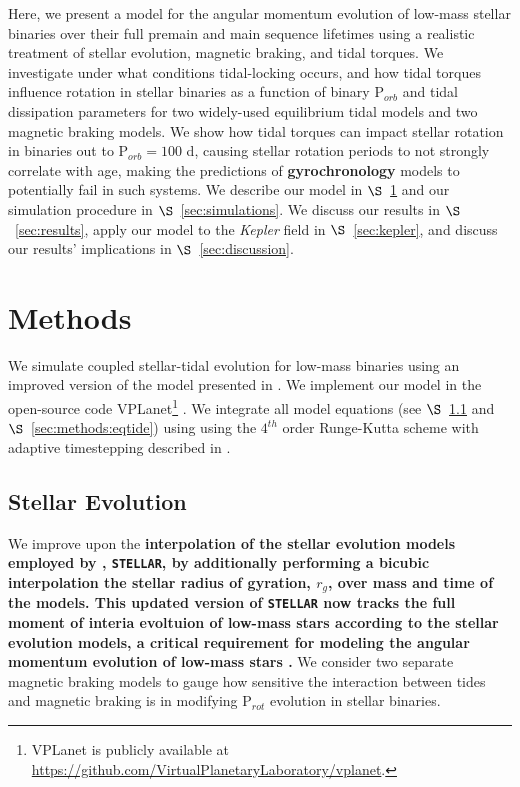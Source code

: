 \documentclass[twocolumn]{aastex61}
\newcommand{\xxx}[1]{{\textbf{#1}}}
\newcommand{\stellar}[0]{\texttt{STELLAR}\xspace}
\newcommand{\kepler}[0]{\textit{Kepler}\xspace}
\begin{document}
Here, we present a model for the angular momentum evolution of low-mass stellar binaries over their full premain and main sequence lifetimes using a realistic treatment of stellar evolution, magnetic braking, and tidal torques. We investigate under what conditions tidal-locking occurs, and how tidal torques influence rotation in stellar binaries as a function of binary P$_{orb}$ and tidal dissipation parameters for two widely-used equilibrium tidal models and two magnetic braking models.  We show how tidal torques can impact stellar rotation in binaries out to P$_{orb} = 100$ d, causing stellar rotation periods to not strongly correlate with age, making the predictions of \xxx{gyrochronology} models to potentially fail in such systems.  We describe our model in $\S$~\ref{sec:methods} and our simulation procedure in $\S$~\ref{sec:simulations}.  We discuss our results in $\S$~\ref{sec:results}, apply our model to the \kepler field in $\S$~\ref{sec:kepler}, and discuss our results' implications in $\S$~\ref{sec:discussion}.


\section{Methods} \label{sec:methods}

We simulate coupled stellar-tidal evolution for low-mass binaries using an improved version of the model presented in \citet{Fleming2018}.  We implement our model in the open-source code VPLanet\footnote{VPLanet is publicly available
at \href{https://github.com/VirtualPlanetaryLaboratory/vplanet}{{https://github.com/VirtualPlanetaryLaboratory/vplanet}}.} \citep[][Barnes et al., in prep]{Barnes2016,vplanet2018}.  We integrate all model equations (see $\S$~\ref{sec:methods:stellar} and $\S$~\ref{sec:methods:eqtide}) using using the $4^{th}$ order Runge-Kutta scheme with adaptive timestepping described in \citet{Fleming2018}.  

\subsection{Stellar Evolution} \label{sec:methods:stellar}

We improve upon the \xxx{interpolation of the \citet{Baraffe2015} stellar evolution models employed by \citet{Fleming2018}, \stellar, by additionally performing a bicubic interpolation the stellar radius of gyration, $r_g$, over mass and time of the \citet{Baraffe2015} models. This updated version of \stellar now tracks the full moment of interia evoltuion of low-mass stars according to the \citet{Baraffe2015} stellar evolution models, a critical requirement for modeling the angular momentum evolution of low-mass stars \citep[e.g.][]{Matt2015}.} We consider two separate magnetic braking models to gauge how sensitive the interaction between tides and magnetic braking is in modifying P$_{rot}$ evolution in stellar binaries. 
\end{document}
